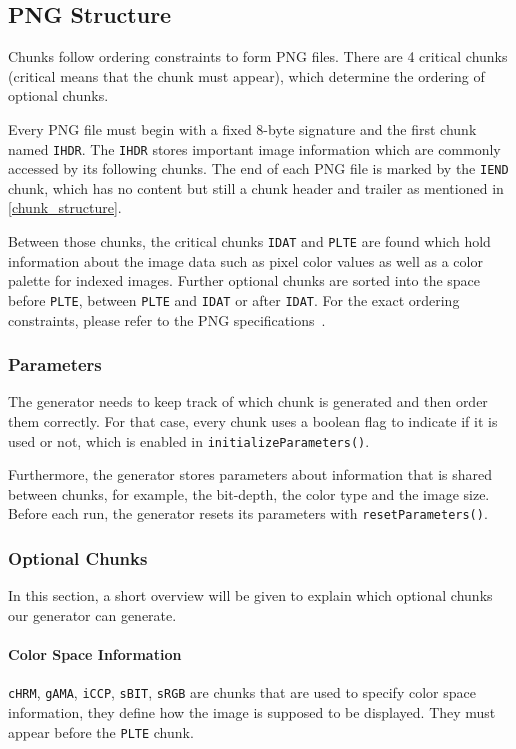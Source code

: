 \documentclass[runningheads]{llncs}
\begin{document}
\subsection{PNG Structure}
Chunks follow ordering constraints to form PNG files. There are 4 critical chunks (critical means that the chunk must appear), which determine the ordering of optional chunks. 

Every PNG file must begin with a fixed 8-byte signature and the first chunk named \texttt{IHDR}. The \texttt{IHDR} stores important image information which are commonly accessed by its following chunks.
The end of each PNG file is marked by the \texttt{IEND} chunk, which has no content but still a chunk header and trailer as mentioned in \ref{chunk_structure}.

Between those chunks, the critical chunks \texttt{IDAT} and \texttt{PLTE} are found which hold information about the image data such as pixel color values as well as a color palette for indexed images. 
Further optional chunks are sorted into the space before \texttt{PLTE}, between \texttt{PLTE} and \texttt{IDAT} or after \texttt{IDAT}. 
For the exact ordering constraints, please refer to the PNG specifications~\cite{libpng_chunks}.
\subsubsection{Parameters}
The generator needs to keep track of which chunk is generated and then order them correctly. For that case, every chunk uses a boolean flag to indicate if it is used or not, which is enabled in \texttt{initializeParameters()}.

Furthermore, the generator stores parameters about information that is shared between chunks, for example, the bit-depth, the color type and the image size. 
Before each run, the generator resets its parameters with \texttt{resetParameters()}.
\subsubsection{Optional Chunks}
In this section, a short overview will be given to explain which optional chunks~\cite{libpng_chunks} our generator can generate.

\paragraph{Color Space Information}
\texttt{cHRM}, \texttt{gAMA}, \texttt{iCCP}, \texttt{sBIT}, \texttt{sRGB} are chunks that are used to specify color space information, they define how the image is supposed to be displayed. They must appear before the \texttt{PLTE} chunk.
\end{document}
